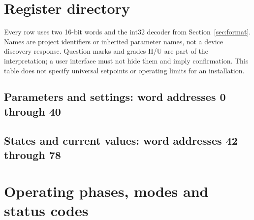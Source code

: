 \documentclass[10pt,a4paper]{article}
\begin{document}

\section{Register directory}
\label{sec:registers}
Every row uses two 16-bit words and the int32 decoder from Section~\ref{sec:format}. Names are project identifiers or inherited parameter names, not a device discovery response. Question marks and grades H/U are part of the interpretation; a user interface must not hide them and imply confirmation. This table does not specify universal setpoints or operating limits for an installation.

\subsection{Parameters and settings: word addresses 0 through 40}


\subsection{States and current values: word addresses 42 through 78}


\section{Operating phases, modes and status codes}
\label{sec:states}
\end{document}

